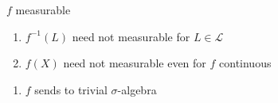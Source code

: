 \begin{fact}$f$ measurable
    \begin{enumerate}
        \item $f^{-1}(L)$ need not measurable for $L \in \mathcal{L}$
        \item $f(X)$ need not measurable even for $f$ continuous
    \end{enumerate}
\end{fact}

\begin{example}
    \begin{enumerate}
        \item $f$ sends to trivial $\sigma$-algebra
    \end{enumerate}
\end{example}



